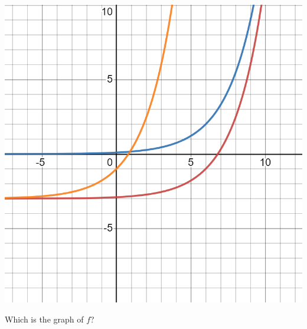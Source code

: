 \documentclass{ximera}
\begin{document}
\begin{exercise}
\begin{exercise}
\begin{exercise}
\begin{exercise}
\begin{exercise}
\begin{exercise}
\begin{exercise}
\begin{exercise}
\includegraphics[width=1\linewidth]{FT23graph.png}

Which is the graph of $f$?
\begin{multipleChoice}

\end{multipleChoice}


\end{exercise}
\end{exercise}
\end{exercise}
\end{exercise}
\end{exercise}
\end{exercise}
\end{exercise}
\end{exercise}
\end{document}
